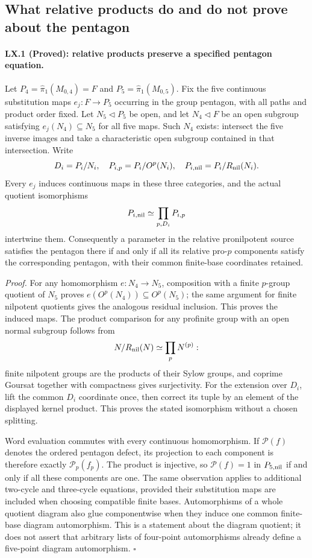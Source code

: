 
\subsection{What relative products do and do not prove about the pentagon}

\paragraph{LX.1 (Proved): relative products preserve a specified pentagon equation.}
Let $P_4=\widehat\pi_1(M_{0,4})=F$ and
$P_5=\widehat\pi_1(M_{0,5})$. Fix the five continuous
substitution maps $e_j:F\to P_5$ occurring in the group
pentagon, with all paths and product order fixed. Let
$N_5\triangleleft P_5$ be open, and let $N_4\triangleleft F$
be an open subgroup satisfying $e_j(N_4)\subseteq N_5$ for
all five maps. Such $N_4$ exists: intersect the five inverse
images and take a characteristic open subgroup contained in
that intersection. Write
\[
 D_i=P_i/N_i,\quad P_{i,p}=P_i/O^p(N_i),\quad
 P_{i,\rm nil}=P_i/R_{\rm nil}(N_i).
\]
Every $e_j$ induces continuous maps in these three categories,
and the actual quotient isomorphisms
\[
 P_{i,\rm nil}\simeq\prod_{p,D_i}P_{i,p}
\]
intertwine them. Consequently a parameter in the relative
pronilpotent source satisfies the pentagon there if and only if
all its relative pro-$p$ components satisfy the corresponding
pentagon, with their common finite-base coordinates retained.

\emph{Proof.}
For any homomorphism $e:N_4\to N_5$, composition with a finite
$p$-group quotient of $N_5$ proves
$e(O^p(N_4))\subseteq O^p(N_5)$; the same argument for finite
nilpotent quotients gives the analogous residual inclusion.
This proves the induced maps. The product comparison for any
profinite group with an open normal subgroup follows from
\[
 N/R_{\rm nil}(N)\simeq\prod_pN^{(p)}:
\]
finite nilpotent groups are the products of their Sylow groups,
and coprime Goursat together with compactness gives surjectivity.
For the extension over $D_i$, lift the common $D_i$ coordinate
once, then correct its tuple by an element of the displayed
kernel product. This proves the stated isomorphism without a
chosen splitting.

Word evaluation commutes with every continuous homomorphism.
If $\mathcal P(f)$ denotes the ordered pentagon defect, its
projection to each component is therefore exactly
$\mathcal P_p(f_p)$. The product is injective, so
$\mathcal P(f)=1$ in $P_{5,\rm nil}$ if and only if all these
components are one. The same observation applies to additional
two-cycle and three-cycle equations, provided their substitution
maps are included when choosing compatible finite bases.
Automorphisms of a whole quotient diagram also glue
componentwise when they induce one common finite-base diagram
automorphism. This is a statement about the diagram quotient;
it does not assert that arbitrary lists of four-point
automorphisms already define a five-point diagram automorphism.
\hfill$\square$

